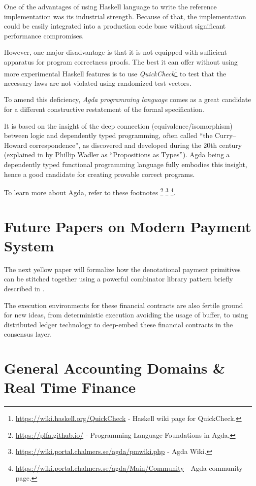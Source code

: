 One of the advantages of using Haskell language to write the reference implementation was its
industrial strength. Because of that, the implementation could be easily integrated into a
production code base without significant performance compromises.

However, one major disadvantage is that it is not equipped with sufficient apparatus for program
correctness proofs. The best it can offer without using more experimental Haskell features is to
use \textit{QuickCheck}\footnote{\url{https://wiki.haskell.org/QuickCheck} - Haskell wiki page for
QuickCheck.} to test that the necessary laws are not violated using randomized test vectors.

To amend this deficiency, \textit{Agda programming language} comes as a great candidate for a
different constructive restatement of the formal specification.

It is based on the insight of the deep connection (equivalence/isomorphism) between logic and
dependently typed programming, often called ``the Curry–Howard correspondence'', as discovered and
developed during the 20th century (explained in \cite{wadler2015propositions} by Phillip Wadler as
``Propositions as Types''). Agda being a dependently typed functional programming language fully
embodies this insight, hence a good candidate for creating provable correct programs.

To learn more about Agda, refer to these footnotes
\footnote{\url{https://plfa.github.io/} - Programming Language Foundations in Agda.}
\footnote{\url{https://wiki.portal.chalmers.se/agda/pmwiki.php} - Agda Wiki.}
\footnote{\url{https://wiki.portal.chalmers.se/agda/Main/Community} - Agda community page.}.

\section{Future Papers on Modern Payment System}

The next yellow paper will formalize how the denotational payment primitives can be stitched
together using a powerful combinator library pattern briefly described
in \cite{peyton2000composing}.

The execution environments for these financial contracts are also fertile ground for new ideas, from
deterministic execution avoiding the usage of buffer, to using distributed ledger technology to
deep-embed these financial contracts in the consensus layer.

\section{General Accounting Domains \& Real Time Finance}

